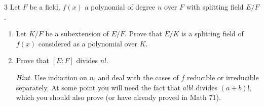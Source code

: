 \documentclass[12pt]{article}
\begin{document}
\begin{problem}{3}
    Let $F$ be a field, $f(x)$ a polynomial of degree $n$ over $F$ with splitting field $E/F$.

    \begin{enumerate}
        \item[(a)] Let $K/F$ be a subextension of $E/F$. Prove that $E/K$ is a splitting field of $f(x)$ considered as a polynomial over $K$.

        \item[(b)] Prove that $[E : F]$ divides $n!$.

        \textit{Hint.} Use induction on $n$, and deal with the cases of $f$ reducible or irreducible separately. At some point you will need the fact that $a! b!$ divides $(a+b)!$, which you should also prove (or have already proved in Math 71).
    \end{enumerate}
\end{problem}
\end{document}
